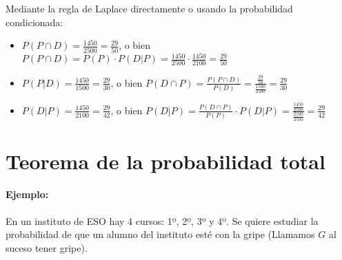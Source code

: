 Mediante la regla de Laplace directamente o usando la probabilidad condicionada:

\begin{itemize}
    \item $P(P \cap D)= \frac{1450}{2500}=\frac{29}{50}$, o bien $P(P \cap D)= P(P)\cdot P(D|P)=\frac{1450}{2500}\cdot \frac{1450}{2100}=\frac{29}{50}$
    \item $P(P|D)=\frac{1450}{1500}=\frac{29}{30}$, o bien $P(D \cap P)=\frac{P(P \cap D)}{P(D)} =\frac{\frac{29}{50}}{\frac{1500}{2500}}=\frac{29}{30}$
    \item $P(D|P)=\frac{1450}{2100}=\frac{29}{42}$, o bien $P(D|P)= \frac{P(D \cap P)}{P(P)} \cdot P(D|P)=\frac{\frac{1450}{2500}}{\frac{2100}{2500}}=\frac{29}{42}$
\end{itemize}


\section{Teorema de la probabilidad total}
\paragraph{Ejemplo:} En un instituto de ESO hay 4 cursos: 1º, 2º, 3º y 4º. Se quiere estudiar la probabilidad de que un alumno del instituto esté con la gripe (Llamamos $G$ al suceso tener gripe). 


